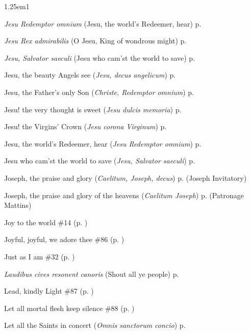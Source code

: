 \begin{hangparas}{1.25em}{1}
\par\noindent
\textit{Jesu Redemptor omnium} (Jesu, the world's Redeemer, hear) \dotfill p. \pageref{ConfessorBishopMattins}
\par\noindent
\textit{Jesu Rex admirabilis} (O Jesu, King of wondrous might) \dotfill p. \pageref{HolyNameInvitatoryHymn}
\par\noindent
\textit{Jesu, Salvator saeculi} (Jesu who cam'st the world to save) \dotfill p. \pageref{AllHallowsMattins}
\par\noindent
Jesu, the beauty Angels see (\textit{Jesu, decus angelicum}) \dotfill p. \pageref{HolyNameMattinsHymn}
\par\noindent
Jesu, the Father's only Son (\textit{Christe, Redemptor omnium}) \dotfill p. \pageref{ChristmasEvensongHymn}
\par\noindent
Jesu! the very thought is sweet (\textit{Jesu dulcis memoria}) \dotfill p. \pageref{HolyNameEvensongHymn}
\par\noindent
Jesu! the Virgins' Crown (\textit{Jesu corona Virginum}) \dotfill p. \pageref{VirginMattins}
\par\noindent
Jesu, the world's Redeemer, hear (\textit{Jesu Redemptor omnium}) \dotfill p. \pageref{ConfessorBishopMattins}
\par\noindent
Jesu who cam'st the world to save (\textit{Jesu, Salvator saeculi}) \dotfill p. \pageref{AllHallowsMattins}
\par\noindent
Joseph, the praise and glory (\textit{Caelitum, Joseph, decus}) \dotfill p. \pageref{JosephInvitatory} (Joseph Invitatory)
\par\noindent
Joseph, the praise and glory of the heavens (\textit{Caelitum Joseph}) \dotfill p. \pageref{PatronageMattins} (Patronage Mattins)
\par\noindent
Joy to the world \dotfill \#14 (p. \pageref{Hymn14})
\par\noindent
Joyful, joyful, we adore thee \dotfill \#86 (p. \pageref{Hymn86})
\par\noindent
Just as I am \dotfill \#32 (p. \pageref{Hymn32})
\par\noindent
\textit{Laudibus cives resonent canoris} (Shout all ye people) \dotfill p. \pageref{BenedictEvensong}
\par\noindent
Lead, kindly Light \dotfill \#87 (p. \pageref{Hymn87})
\par\noindent
Let all mortal flesh keep silence \dotfill \#88 (p. \pageref{Hymn88})
\par\noindent
Let all the Saints in concert (\textit{Omnis sanctorum concio}) \dotfill p. \pageref{AnneIIEvensong}

\end{hangparas}
